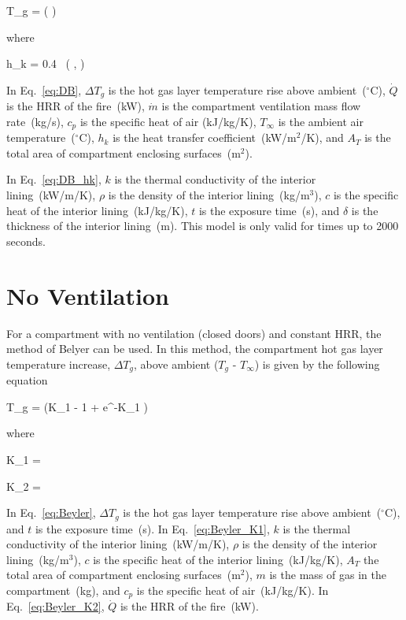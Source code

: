 \be
\Delta T_g = \left(  \right)
\label{eq:DB}
\ee

\noindent where

\be
h_k = 0.4\  \left(  ,  \right)
\label{eq:DB_hk}
\ee

In Eq.~\ref{eq:DB}, $\Delta T_g$ is the hot gas layer temperature rise above ambient~($^\circ$C), $\dot Q$ is the HRR of the fire~(kW), $\dot m$ is the compartment ventilation mass flow rate~(kg/s), $c_p$ is the specific heat of air (kJ/kg/K), $T_\infty$ is the ambient air temperature~($^\circ$C), $h_k$ is the heat transfer coefficient~(kW/m$^2$/K), and $A_T$ is the total area of compartment enclosing surfaces~(m$^2$).

In Eq.~\ref{eq:DB_hk}, $k$ is the thermal conductivity of the interior lining~(kW/m/K), $\rho$ is the density of the interior lining~(kg/m$^3$), $c$ is the specific heat of the interior lining~(kJ/kg/K), $t$ is the exposure time~(s), and $\delta$ is the thickness of the interior lining~(m). This model is only valid for times up to 2000 seconds.



\clearpage


\section{No Ventilation}

For a compartment with no ventilation (closed doors) and constant HRR, the method of Belyer can be used. In this method, the compartment hot gas layer temperature increase, $\Delta T_g$, above ambient ($T_g$ - $T_\infty$) is given by the following equation

\be
\Delta T_g =  (K_1  - 1 + e^{-K_1 })
\label{eq:Beyler}
\ee

\noindent where

\be
K_1 = 
\label{eq:Beyler_K1}
\ee

\be
K_2 = 
\label{eq:Beyler_K2}
\ee

In Eq.~\ref{eq:Beyler}, $\Delta T_g$ is the hot gas layer temperature rise above ambient~($^\circ$C), and $t$ is the exposure time~(s). In Eq.~\ref{eq:Beyler_K1}, $k$ is the thermal conductivity of the interior lining~(kW/m/K), $\rho$ is the density of the interior lining~(kg/m$^3$), $c$ is the specific heat of the interior lining~(kJ/kg/K), $A_T$ the total area of compartment enclosing surfaces~(m$^2$), $m$ is the mass of gas in the compartment~(kg), and $c_p$ is the specific heat of air~(kJ/kg/K). In Eq.~\ref{eq:Beyler_K2}, $\dot Q$ is the HRR of the fire~(kW).


